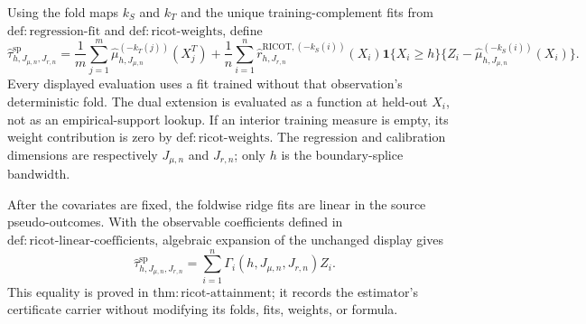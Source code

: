 Using the fold maps \(k_S\) and \(k_T\) and the unique training-complement fits from \(\mathrm{def:regression\text{-}fit}\) and \(\mathrm{def:ricot\text{-}weights}\), define
\[
\widehat\tau^{\mathrm{sp}}_{h,J_{\mu,n},J_{r,n}}=
\frac1m\sum_{j=1}^m\widehat\mu_{h,J_{\mu,n}}^{(-k_T(j))}(X_j^T)
+\frac1n\sum_{i=1}^n\widehat r^{\mathrm{RICOT},(-k_S(i))}_{h,J_{r,n}}(X_i)\mathbf 1\{X_i\ge h\}\{Z_i-\widehat\mu_{h,J_{\mu,n}}^{(-k_S(i))}(X_i)\}.
\]
Every displayed evaluation uses a fit trained without that observation's deterministic fold. The dual extension is evaluated as a function at held-out \(X_i\), not as an empirical-support lookup. If an interior training measure is empty, its weight contribution is zero by \(\mathrm{def:ricot\text{-}weights}\). The regression and calibration dimensions are respectively \(J_{\mu,n}\) and \(J_{r,n}\); only \(h\) is the boundary-splice bandwidth.

After the covariates are fixed, the foldwise ridge fits are linear in the source pseudo-outcomes. With the observable coefficients defined in \(\mathrm{def:ricot\text{-}linear\text{-}coefficients}\), algebraic expansion of the unchanged display gives
\[
\widehat\tau^{\mathrm{sp}}_{h,J_{\mu,n},J_{r,n}}=\sum_{i=1}^n\Gamma_i(h,J_{\mu,n},J_{r,n})Z_i.
\]
This equality is proved in \(\mathrm{thm:ricot\text{-}attainment}\); it records the estimator's certificate carrier without modifying its folds, fits, weights, or formula.
